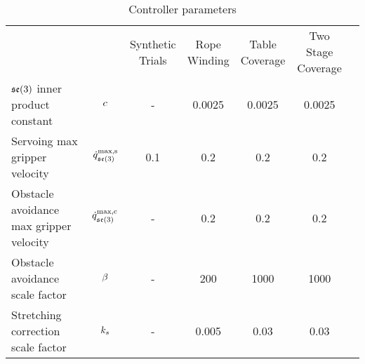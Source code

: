 \begin{table}[t]
\centering
\caption{Controller parameters}
\label{tab:controller_param_table}
\begin{tabular}{lcccccc}
\hline\noalign{\smallskip}
                                                        &                       & \makecell{Synthetic\\Trials} 
                                                                                & \makecell{Rope\\Winding}
                                                                                & \makecell{Table\\Coverage}
                                                                                & \makecell{Two Stage\\Coverage} \\
\noalign{\smallskip}\hline\noalign{\smallskip}
\makecell[l]{$\mathfrak{se}(3)$ inner\\product constant}      & $c$        &   - & 0.0025 & 0.0025 & 0.0025 \\
\noalign{\smallskip}
\makecell[l]{Servoing max\\gripper velocity}           & $\dot{q}^\textrm{max,s}_{\mathfrak{se}(3)}$  & 0.1 &    0.2 &    0.2 &    0.2 \\
\noalign{\smallskip}
\makecell[l]{Obstacle avoidance\\max gripper velocity} & $\dot{q}^\textrm{max,c}_{\mathfrak{se}(3)}$    &   - &    0.2 &    0.2 &    0.2 \\
\noalign{\smallskip}
\makecell[l]{Obstacle avoidance\\scale factor}         & $\beta$      &   - &    200 &   1000 &   1000 \\
\noalign{\smallskip}
\makecell[l]{Stretching correction\\scale factor}      & $k_s$ &   - &  0.005 &   0.03 &   0.03 \\
\hline
\end{tabular}
\end{table}
